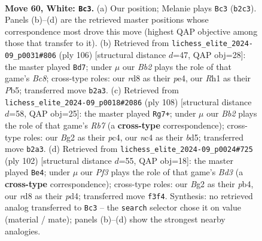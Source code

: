 \documentclass[11pt]{article}
\begin{document}
\clearpage

\begin{figure}[p]\centering
\begin{subfigure}{0.46\textwidth}\centering
\resizebox{\linewidth}{!}{%
\newchessgame
\chessboard[
  setfen={3r4/4b2p/p2p2k1/4p2p/2n1P3/5P2/1B2K1B1/7R w - - 0 60},
  showmover=false,
  pgfstyle=straightmove, color=movearrow, markmove={b2-c3}
]}
\caption{}
\end{subfigure}\hfill
\begin{subfigure}{0.46\textwidth}\centering
\resizebox{\linewidth}{!}{%
\newchessgame
\chessboard[
  setfen={2B5/1R2n3/3r2p1/1P3pkp/4p3/4P1P1/4K3/8 w - - 2 54},
  showmover=false,
  pgfstyle=straightmove, color=movearrow, markmove={c8-d7}
]}
\caption{}
\end{subfigure}
\\[4pt]
\begin{subfigure}{0.46\textwidth}\centering
\resizebox{\linewidth}{!}{%
\newchessgame
\chessboard[
  setfen={8/1R6/p3p1kp/P2bP1p1/2p3P1/6K1/1pr5/8 w - - 0 55},
  showmover=false,
  pgfstyle=straightmove, color=movearrow, markmove={b7-g7}
]}
\caption{}
\end{subfigure}\hfill
\begin{subfigure}{0.46\textwidth}\centering
\resizebox{\linewidth}{!}{%
\newchessgame
\chessboard[
  setfen={2R5/4bpk1/2P1p2p/3n2p1/1p1p1P2/3B1KPP/8/8 w - - 1 52},
  showmover=false,
  pgfstyle=straightmove, color=movearrow, markmove={d3-e4}
]}
\caption{}
\end{subfigure}
\caption{\textbf{Move 60, White: \texttt{Bc3}.} (a) Our position; Melanie plays \texttt{Bc3} (\texttt{b2c3}). Panels (b)--(d) are the retrieved master positions whose correspondence most drove this move (highest QAP objective among those that transfer to it). (b) Retrieved from \texttt{lichess\_elite\_2024-09\_p0031\#806} (ply 106) [structural distance $d$=47, QAP obj=28]: the master played \texttt{Bd7}; under $\mu$ our \emph{Bb2} plays the role of that game's \emph{Bc8}; cross-type roles: our \emph{r}d8 as their \emph{p}e4, our \emph{R}h1 as their \emph{P}b5; transferred move \texttt{b2a3}. (c) Retrieved from \texttt{lichess\_elite\_2024-09\_p0018\#2086} (ply 108) [structural distance $d$=58, QAP obj=25]: the master played \texttt{Rg7+}; under $\mu$ our \emph{Bb2} plays the role of that game's \emph{Rb7} (a \textbf{cross-type} correspondence); cross-type roles: our \emph{B}g2 as their \emph{p}c4, our \emph{n}c4 as their \emph{b}d5; transferred move \texttt{b2a3}. (d) Retrieved from \texttt{lichess\_elite\_2024-09\_p0024\#725} (ply 102) [structural distance $d$=55, QAP obj=18]: the master played \texttt{Be4}; under $\mu$ our \emph{Pf3} plays the role of that game's \emph{Bd3} (a \textbf{cross-type} correspondence); cross-type roles: our \emph{B}g2 as their \emph{p}b4, our \emph{r}d8 as their \emph{p}d4; transferred move \texttt{f3f4}. Synthesis: no retrieved analog transferred to \texttt{Bc3} -- the \texttt{search} selector chose it on value (material / mate); panels (b)--(d) show the strongest nearby analogies.}
\label{fig:thought-m118}
\end{figure}
\end{document}
